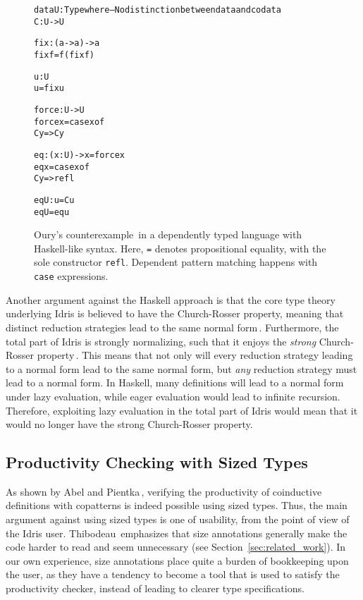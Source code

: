 \begin{figure}
\begin{alltt}
data U : Type where         -- No distinction between data and codata
  C : U -> U

fix : (a -> a) -> a
fix f = f (fix f)

u : U
u = fix u

force : U -> U
force x = case x of
            C y => C y

eq : (x : U) -> x = force x
eq x = case x of
         C y => refl

eqU : u = C u
eqU = eq u
\end{alltt}
\caption{Oury's counterexample\,\citep{OuryCounterexample} in a dependently typed language with Haskell-like syntax. Here, \texttt{=} denotes propositional equality, with the sole constructor \texttt{refl}. Dependent pattern matching happens with \texttt{case} expressions.}
\label{fig:subject_reduction_problem}
\end{figure}

Another argument against the Haskell approach is that the core type theory underlying Idris is believed to have the Church-Rosser property, meaning that distinct reduction strategies lead to the same normal form\,\citep{BradyIdrisImpl13}. Furthermore, the total part of Idris is strongly normalizing, such that it enjoys the \emph{strong} Church-Rosser property\,\citep{Turner04totalfunctional}. This means that not only will every reduction strategy leading to a normal form lead to the same normal form, but \emph{any} reduction strategy must lead to a normal form. In Haskell, many definitions will lead to a normal form under lazy evaluation, while eager evaluation would lead to infinite recursion. Therefore, exploiting lazy evaluation in the total part of Idris would mean that it would no longer have the strong Church-Rosser property.

\subsection{Productivity Checking with Sized Types}
As shown by Abel and Pientka\,\citep{Abel13Wellfounded}, verifying the productivity of coinductive definitions with copatterns is indeed possible using sized types. Thus, the main argument against using sized types is one of usability, from the point of view of the Idris user. Thibodeau\,\citep{Thibodeau11} emphasizes that size annotations generally make the code harder to read and seem unnecessary (see Section~\ref{sec:related_work}). In our own experience, size annotations place quite a burden of bookkeeping upon the user, as they have a tendency to become a tool that is used to satisfy the productivity checker, instead of leading to clearer type specifications.

